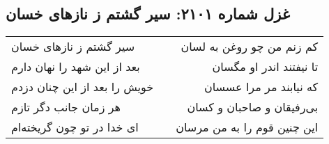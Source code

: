\begin{center}
\section*{غزل شماره ۲۱۰۱: سیر گشتم ز نازهای خسان}
\label{sec:2101}
\begin{longtable}{l p{0.5cm} r}
سیر گشتم ز نازهای خسان
&&
کم زنم من چو روغن به لسان
\\
بعد از این شهد را نهان دارم
&&
تا نیفتند اندر او مگسان
\\
خویش را بعد از این چنان دزدم
&&
که نیابند مر مرا عسسان
\\
هر زمان جانب دگر تازم
&&
بی‌رفیقان و صاحبان و کسان
\\
ای خدا در تو چون گریخته‌ام
&&
این چنین قوم را به من مرسان
\\
\end{longtable}
\end{center}
